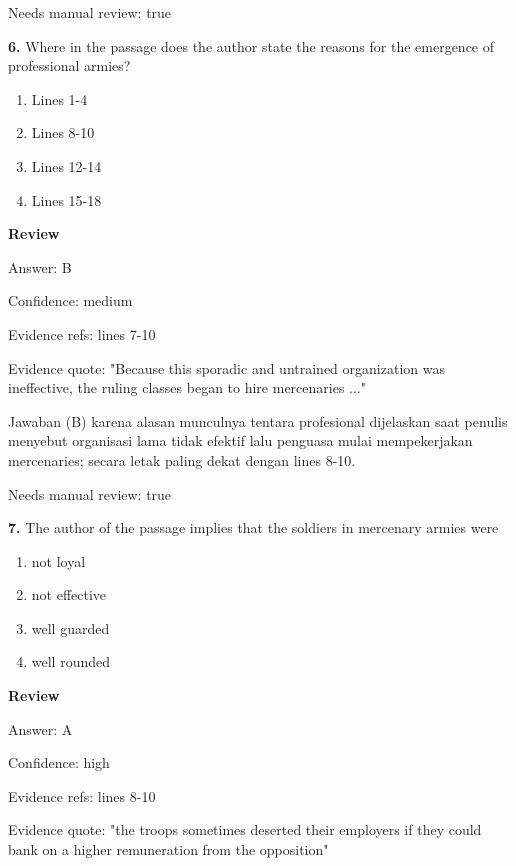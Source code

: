 \documentclass[12pt]{article}
\begin{document}
Needs manual review: true\par
\endgroup
\par
\vspace{0.25\baselineskip}
\noindent\textbf{6.} Where in the passage does the author state the reasons for the emergence of professional armies?
\begin{enumerate}[label=(\Alph*),leftmargin=*,itemsep=0.2em]
\item Lines 1-4
\item Lines 8-10
\item Lines 12-14
\item Lines 15-18
\end{enumerate}
\par
\begingroup
\setlength{\parskip}{0pt}
\setlength{\parindent}{0pt}
\textbf{Review}\par
Answer: B\par
Confidence: medium\par
Evidence refs: lines 7-10\par
Evidence quote: "Because this sporadic and untrained organization was ineffective, the ruling classes began to hire mercenaries ..."\par
Jawaban (B) karena alasan munculnya tentara profesional dijelaskan saat penulis menyebut organisasi lama tidak efektif lalu penguasa mulai mempekerjakan mercenaries; secara letak paling dekat dengan lines 8-10.\par
Needs manual review: true\par
\endgroup
\par
\vspace{0.25\baselineskip}
\noindent\textbf{7.} The author of the passage implies that the soldiers in mercenary armies were
\begin{enumerate}[label=(\Alph*),leftmargin=*,itemsep=0.2em]
\item not loyal
\item not effective
\item well guarded
\item well rounded
\end{enumerate}
\par
\begingroup
\setlength{\parskip}{0pt}
\setlength{\parindent}{0pt}
\textbf{Review}\par
Answer: A\par
Confidence: high\par
Evidence refs: lines 8-10\par
Evidence quote: "the troops sometimes deserted their employers if they could bank on a higher remuneration from the opposition"\par
\end{document}
